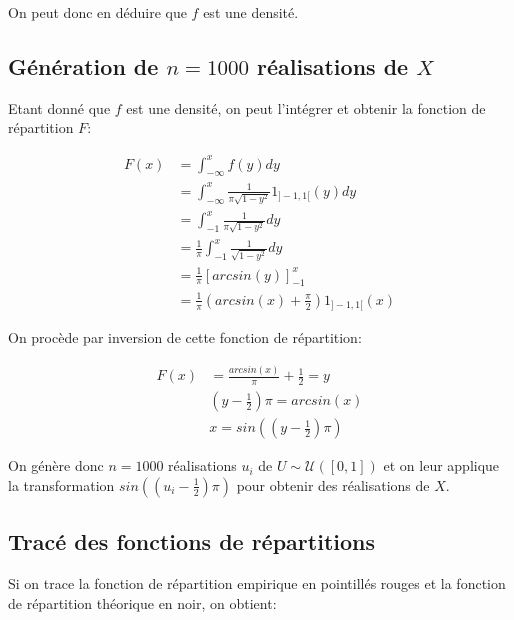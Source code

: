 \documentclass{article}
\begin{document}
\begin{multicols}{2}
On peut donc en déduire que $f$ est une densité.

\subsection{Génération de $n = 1000$ réalisations de $X$}\label{subsec:ex22}

Etant donné que $f$ est une densité, on peut l'intégrer et obtenir la fonction
de répartition $F$:

\begin{equation}
    \begin{split}
        F(x)
        &= \int_{-\infty}^{x} f(y) dy \\
        &= \int_{-\infty}^{x} \frac{1}{\pi \sqrt{1 - y^2}} 1_{]-1, 1[}(y) dy \\
        &= \int_{-1}^{x} \frac{1}{\pi \sqrt{1 - y^2}} dy \\
        &= \frac{1}{\pi} \int_{-1}^{x} \frac{1}{\sqrt{1 - y^2}} dy \\
        &= \frac{1}{\pi} [arcsin(y)]_{-1}^{x} \\
        &= \frac{1}{\pi} \left(arcsin(x) + \frac{\pi}{2}\right) 1_{]-1, 1[}(x)
    \end{split}
\end{equation}

On procède par inversion de cette fonction de répartition:

\begin{equation}
    \begin{split}
        F(x) &= \frac{arcsin(x)}{\pi} + \frac{1}{2} = y \\
             & \left(y - \frac{1}{2}\right) \pi = arcsin(x) \\
             & x = sin\left(\left(y - \frac{1}{2}\right) \pi \right)
    \end{split}
\end{equation}

On génère donc $n = 1000$ réalisations $u_i$ de $U \sim \mathcal{U}([0, 1])$ et
on leur applique la transformation
$sin\left(\left(u_i - \frac{1}{2}\right) \pi \right)$ pour obtenir des
réalisations de $X$.

\subsection{Tracé des fonctions de répartitions}\label{subsec:ex23}

Si on trace la fonction de répartition empirique en pointillés rouges et la
fonction de répartition théorique en noir, on obtient:


\end{multicols}
\end{document}
